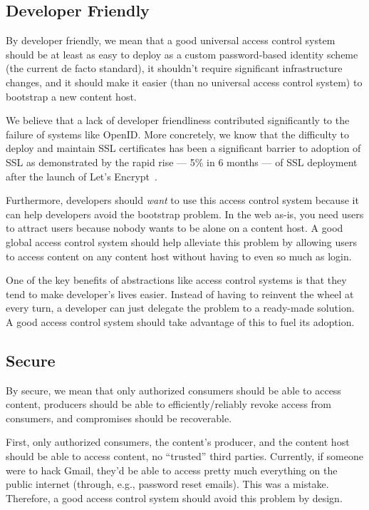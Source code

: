 \documentclass[pdftex,12pt,a4papaer,twoside,notitlepage]{report}
\begin{document}
\subsection{Developer Friendly}
\label{sub:goal-developer}

By developer friendly, we mean that a good universal access control system
should be at least as easy to deploy as a custom password-based identity scheme
(the current de facto standard), it shouldn't require significant infrastructure
changes, and it should make it easier (than no universal access control system)
to bootstrap a new content host.

We believe that a lack of developer friendliness contributed significantly to
the failure of systems like OpenID\cite{openid}. More concretely, we know that
the difficulty to deploy and maintain SSL certificates has been a significant
barrier to adoption of SSL as demonstrated by the rapid rise --- 5\% in 6 months
--- of SSL deployment after the launch of Let's Encrypt~\cite{lets-encrypt}.

Furthermore, developers should \emph{want} to use this access control system
because it can help developers avoid the bootstrap problem. In the web as-is,
you need users to attract users because nobody wants to be alone on a content
host. A good global access control system should help alleviate this problem by
allowing users to access content on any content host without having to even so
much as login.

One of the key benefits of abstractions like access control systems is that they
tend to make developer's lives easier. Instead of having to reinvent the wheel
at every turn, a developer can just delegate the problem to a ready-made
solution. A good access control system should take advantage of this to fuel its
adoption.

\subsection{Secure}

By secure, we mean that only authorized consumers should be able to access
content, producers should be able to efficiently/reliably revoke access from
consumers, and compromises should be recoverable.

First, only authorized consumers, the content's producer, and the content host
should be able to access content, no ``trusted'' third parties. Currently, if
someone were to hack Gmail, they'd be able to access pretty much everything on
the public internet (through, e.g., password reset emails). This was a mistake.
Therefore, a good access control system should avoid this problem by design.
\end{document}
